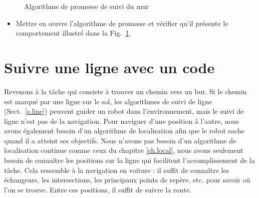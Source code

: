 \begin{figure}
\begin{center}
\caption{Algorithme de promesse de suivi du mur}\label{fig.wall-following-pledge}
\end{center}
\end{figure}

\begin{framed}
\begin{itemize}
\item Mettre en œuvre l'algorithme de promesse et vérifier qu'il présente le comportement illustré dans la Fig.~\ref{fig.wall-following-pledge}.
\end{itemize}
\end{framed}

\section{Suivre une ligne avec un code}\label{s.no-localization}

Revenons à la tâche qui consiste à trouver un chemin vers un but. Si le chemin est marqué par une ligne sur le sol, les algorithmes de suivi de ligne (Sect.~\ref{s.line}) peuvent guider un robot dans l'environnement, mais le suivi de ligne n'est pas de la navigation. Pour naviguer d'une position à l'autre, nous avons également besoin d'un algorithme de localisation afin que le robot sache quand il a atteint ses objectifs. Nous n'avons pas besoin d'un algorithme de localisation continue comme ceux du chapitre \ref{ch.local}, nous avons seulement besoin de connaître les positions sur la ligne qui facilitent l'accomplissement de la tâche. Cela ressemble à la navigation en voiture : il suffit de connaître les échangeurs, les intersections, les principaux points de repère, etc. pour savoir où l'on se trouve. Entre ces positions, il suffit de suivre la route.

